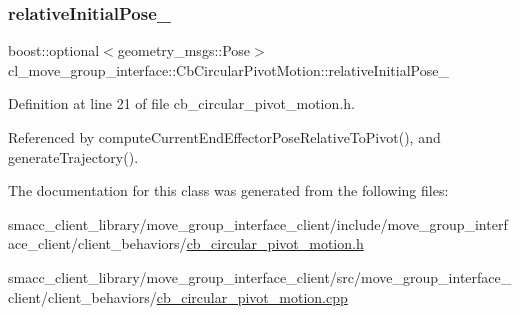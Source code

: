 \subsubsection{\texorpdfstring{relative\+Initial\+Pose\+\_\+}{relativeInitialPose\_}}
{\footnotesize\ttfamily boost\+::optional$<$geometry\+\_\+msgs\+::\+Pose$>$ cl\+\_\+move\+\_\+group\+\_\+interface\+::\+Cb\+Circular\+Pivot\+Motion\+::relative\+Initial\+Pose\+\_\+}



Definition at line 21 of file cb\+\_\+circular\+\_\+pivot\+\_\+motion.\+h.



Referenced by compute\+Current\+End\+Effector\+Pose\+Relative\+To\+Pivot(), and generate\+Trajectory().



The documentation for this class was generated from the following files\+:\begin{DoxyCompactItemize}
\item 
smacc\+\_\+client\+\_\+library/move\+\_\+group\+\_\+interface\+\_\+client/include/move\+\_\+group\+\_\+interface\+\_\+client/client\+\_\+behaviors/\hyperlink{cb__circular__pivot__motion_8h}{cb\+\_\+circular\+\_\+pivot\+\_\+motion.\+h}\item 
smacc\+\_\+client\+\_\+library/move\+\_\+group\+\_\+interface\+\_\+client/src/move\+\_\+group\+\_\+interface\+\_\+client/client\+\_\+behaviors/\hyperlink{cb__circular__pivot__motion_8cpp}{cb\+\_\+circular\+\_\+pivot\+\_\+motion.\+cpp}\end{DoxyCompactItemize}
